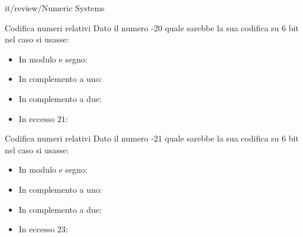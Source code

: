 \documentclass[11pt]{article}
\begin{document}
\begin{quiz}{it/review/Numeric Systems}
\begin{cloze}[points=1,shuffle=false]{Codifica numeri relativi}
Dato il numero -20 quale sarebbe la sua codifica su 6 bit nel caso si usasse:
\begin{itemize}
\item In modulo e segno: 
\item In complemento a uno: 
\item In complemento a due: 
\item In eccesso $21$: 
\end{itemize}
\end{cloze}

\begin{cloze}[points=1,shuffle=false]{Codifica numeri relativi}
Dato il numero -21 quale sarebbe la sua codifica su 6 bit nel caso si usasse:
\begin{itemize}
\item In modulo e segno: 
\item In complemento a uno: 
\item In complemento a due: 
\item In eccesso $23$: 
\end{itemize}
\end{cloze}


\end{quiz}
\end{document}
